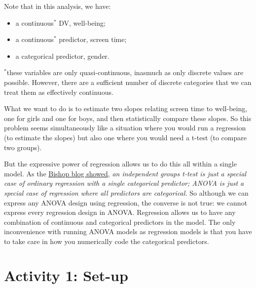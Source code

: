 \documentclass[]{book}
\begin{document}
Note that in this analysis, we have:

\begin{itemize}
\item
  a continuous\(^*\) DV, well-being;
\item
  a continuous\(^*\) predictor, screen time;
\item
  a categorical predictor, gender.
\end{itemize}

\(^*\)these variables are only quasi-continuous, inasmuch as only discrete values are possible. However, there are a sufficient number of discrete categories that we can treat them as effectively continuous.

What we want to do is to estimate two slopes relating screen time to well-being, one for girls and one for boys, and then statistically compare these slopes. So this problem seems simultaneously like a situation where you would run a regression (to estimate the slopes) but also one where you would need a t-test (to compare two groups).

But the expressive power of regression allows us to do this all within a single model. As the \href{http://deevybee.blogspot.com/2017/11/anova-t-tests-and-regression-different.html}{Bishop blog showed}, \emph{an independent groups t-test is just a special case of ordinary regression with a single categorical predictor; ANOVA is just a special case of regression where all predictors are categorical.} So although we can express any ANOVA design using regression, the converse is not true: we cannot express every regression design in ANOVA. Regression allows us to have any combination of continuous and categorical predictors in the model. The only inconvenience with running ANOVA models as regression models is that you have to take care in how you numerically code the categorical predictors.

\hypertarget{activity-1-set-up-12}{%
\section{Activity 1: Set-up}\label{activity-1-set-up-12}}
\end{document}
